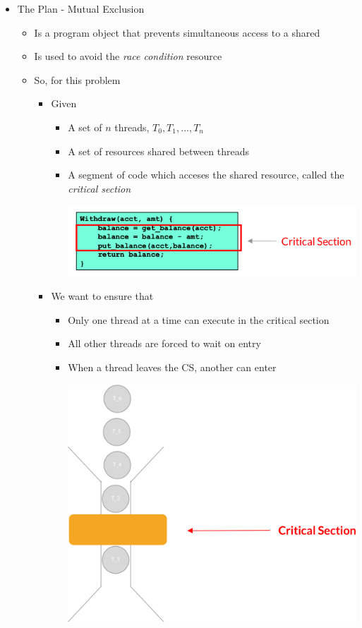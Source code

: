 \documentclass[12pt]{article}
\begin{document}
\begin{itemize}
    \item The Plan - Mutual Exclusion
    \begin{itemize}
        \item Is a program object that prevents simultaneous access to a shared
        \item Is used to avoid the \textit{race condition}
        resource
        \item So, for this problem
        \begin{itemize}
            \item Given

            \begin{itemize}
                \item A set of $n$ threads, $T_0, T_1, ... , T_n$
                \item A set of resources shared between threads
                \item A segment of code which acceses the shared resource, called
                the \textit{critical section}

                \begin{center}
                \includegraphics[width=0.7\linewidth]{images/week_2_notes_2_5.png}
                \end{center}
            \end{itemize}

            \item We want to ensure that

            \begin{itemize}
                \item Only one thread at a time can execute in the critical section
                \item All other threads are forced to wait on entry
                \item When a thread leaves the CS, another can enter


                \begin{center}
                \includegraphics[width=0.5\linewidth]{images/week_2_notes_2_6.png}
                \end{center}
            \end{itemize}
        \end{itemize}
    \end{itemize}


\end{itemize}
\end{document}

